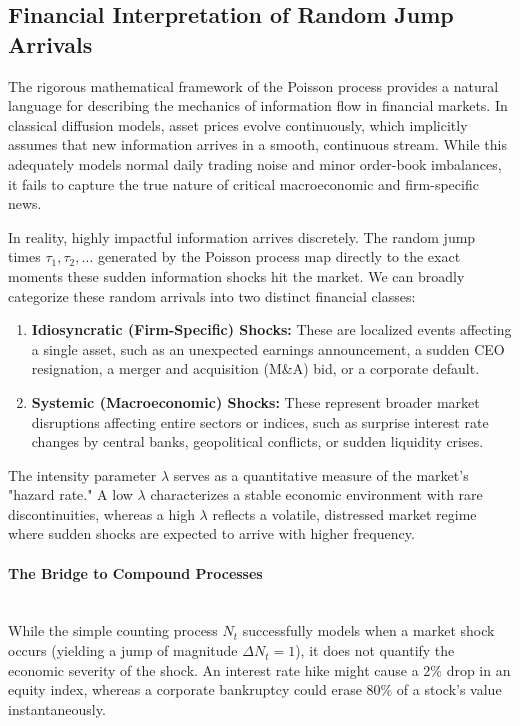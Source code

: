 \subsection{Financial Interpretation of Random Jump Arrivals}
The rigorous mathematical framework of the Poisson process provides a natural language for describing the mechanics of information flow in financial markets. In classical diffusion models, asset prices evolve continuously, which implicitly assumes that new information arrives in a smooth, continuous stream. While this adequately models normal daily trading noise and minor order-book imbalances, it fails to capture the true nature of critical macroeconomic and firm-specific news.

In reality, highly impactful information arrives discretely. The random jump times $\tau_1, \tau_2, \dots$ generated by the Poisson process map directly to the exact moments these sudden information shocks hit the market. We can broadly categorize these random arrivals into two distinct financial classes:
\begin{enumerate}
    \item \textbf{Idiosyncratic (Firm-Specific) Shocks:} These are localized events affecting a single asset, such as an unexpected earnings announcement, a sudden CEO resignation, a merger and acquisition (M\&A) bid, or a corporate default.
    \item \textbf{Systemic (Macroeconomic) Shocks:} These represent broader market disruptions affecting entire sectors or indices, such as surprise interest rate changes by central banks, geopolitical conflicts, or sudden liquidity crises.
\end{enumerate}
The intensity parameter $\lambda$ serves as a quantitative measure of the market's "hazard rate." A low $\lambda$ characterizes a stable economic environment with rare discontinuities, whereas a high $\lambda$ reflects a volatile, distressed market regime where sudden shocks are expected to arrive with higher frequency.
\paragraph{The Bridge to Compound Processes}~\\
While the simple counting process $N_t$ successfully models when a market shock occurs (yielding a jump of magnitude $\Delta N_t = 1$), it does not quantify the economic severity of the shock. An interest rate hike might cause a $2\%$ drop in an equity index, whereas a corporate bankruptcy could erase $80\%$ of a stock's value instantaneously.

